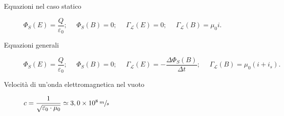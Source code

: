 \documentclass[a4paper,11pt,italian]{article}
\begin{document}
\begin{description}
%   
  
  \item[Equazioni nel caso statico] $ \Phi_S(E) = \dfrac{Q}{\varepsilon_0}; ~~~~~~ \Phi_S(B) = 0; ~~~~~~ \Gamma_\mathscr{L}(E) = 0; ~~~~~~ \Gamma_\mathscr{L}(B) = \mu_0 i.$

  \item[Equazioni generali] $ \Phi_S(E) = \dfrac{Q}{\varepsilon_0}; ~~~~~~ \Phi_S(B) = 0; ~~~~~~ \Gamma_\mathscr{L}(E) = - \dfrac{\Delta\Phi_S(B)}{\Delta t}; ~~~~~~ \Gamma_\mathscr{L}(B) = \mu_0 \left( i + i_s \right) .$

  
%   
  
  \item[Velocità di un'onda elettromagnetica nel vuoto] 
  $ c = \dfrac{1}{\sqrt{\varepsilon_0\cdot \mu_0}} \simeq 3,0 \times 10^8 \,	\sfrac{m}{s} $
  

\end{description}
\end{document}
